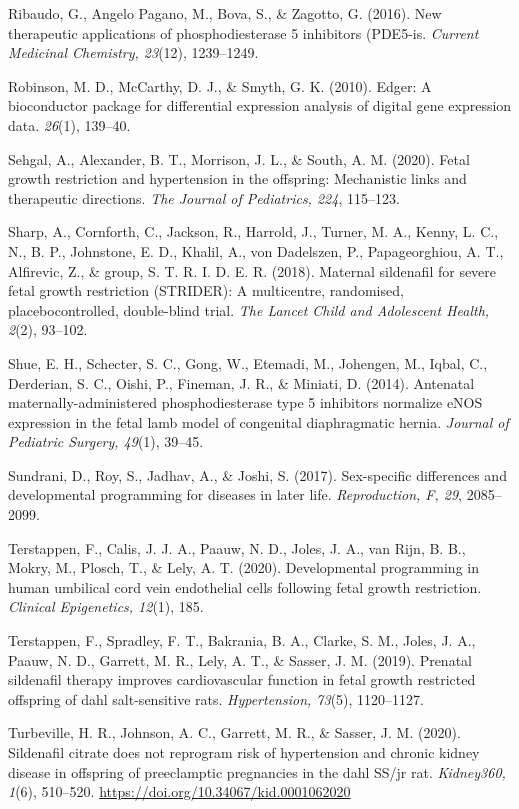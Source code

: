 \documentclass[authordate, empirical,issue]{jote-new-article}
\begin{document}
Ribaudo, G., Angelo Pagano, M., Bova, S., \& Zagotto, G. (2016). New therapeutic applications of phosphodiesterase 5 inhibitors (PDE5-is. \emph{Current Medicinal Chemistry, 23}(12), 1239–1249. 

Robinson, M. D., McCarthy, D. J., \& Smyth, G. K. (2010). Edger: A bioconductor package for differential expression analysis of digital gene expression data. \emph{26}(1), 139–40.

Sehgal, A., Alexander, B. T., Morrison, J. L., \& South, A. M. (2020). Fetal growth restriction and hypertension in the offspring: Mechanistic links and therapeutic directions. \emph{The Journal of Pediatrics, 224}, 115–123.

Sharp, A., Cornforth, C., Jackson, R., Harrold, J., Turner, M. A., Kenny, L. C., N., B. P., Johnstone, E. D., Khalil, A., von Dadelszen, P., Papageorghiou, A. T., Alfirevic, Z., \& group, S. T. R. I. D. E. R. (2018). Maternal sildenafil for severe fetal growth restriction (STRIDER): A multicentre, randomised, placebocontrolled, double-blind trial. \emph{The Lancet Child and
Adolescent Health, 2}(2), 93–102.

Shue, E. H., Schecter, S. C., Gong, W., Etemadi, M., Johengen, M., Iqbal, C., Derderian, S. C., Oishi, P., Fineman, J. R., \& Miniati, D. (2014). Antenatal maternally-administered phosphodiesterase type 5 inhibitors normalize eNOS expression in the fetal lamb model of congenital diaphragmatic hernia. \emph{Journal of Pediatric Surgery, 49}(1), 39–45.

Sundrani, D., Roy, S., Jadhav, A., \& Joshi, S. (2017). Sex-specific differences and developmental programming for diseases in later life. \emph{Reproduction, F, 29}, 2085–2099.

Terstappen, F., Calis, J. J. A., Paauw, N. D., Joles, J. A., van Rijn, B. B., Mokry, M., Plosch, T., \& Lely, A. T. (2020). Developmental programming in human umbilical cord vein endothelial cells following fetal growth restriction. \emph{Clinical Epigenetics, 12}(1), 185.

Terstappen, F., Spradley, F. T., Bakrania, B. A., Clarke, S. M., Joles, J. A., Paauw, N. D., Garrett, M. R., Lely, A. T., \& Sasser, J. M. (2019). Prenatal sildenafil therapy improves cardiovascular function in fetal growth restricted offspring of dahl salt-sensitive rats. \emph{Hypertension, 73}(5), 1120–1127.

Turbeville, H. R., Johnson, A. C., Garrett, M. R., \& Sasser, J. M. (2020). Sildenafil citrate does not reprogram risk of hypertension and chronic kidney disease in offspring of preeclamptic pregnancies in the dahl SS/jr rat. \emph{Kidney360, 1}(6), 510–520. \url{https://doi.org/10.34067/kid.0001062020}
\end{document}

